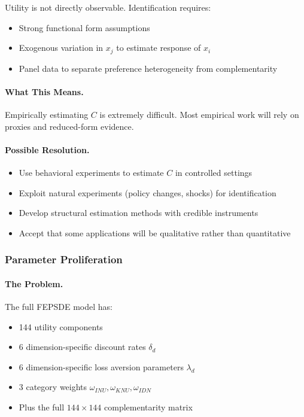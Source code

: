 Utility is not directly observable. Identification requires:
\begin{itemize}
  \item Strong functional form assumptions
  \item Exogenous variation in $x_j$ to estimate response of $x_i$
  \item Panel data to separate preference heterogeneity from complementarity
\end{itemize}

\paragraph{What This Means.}
Empirically estimating $C$ is extremely difficult.
Most empirical work will rely on proxies and reduced-form evidence.

\paragraph{Possible Resolution.}
\begin{itemize}
  \item Use behavioral experiments to estimate $C$ in controlled settings
  \item Exploit natural experiments (policy changes, shocks) for identification
  \item Develop structural estimation methods with credible instruments
  \item Accept that some applications will be qualitative rather than quantitative
\end{itemize}

\subsubsection{Parameter Proliferation}

\paragraph{The Problem.}
The full FEPSDE model has:
\begin{itemize}
  \item 144 utility components
  \item 6 dimension-specific discount rates $\delta_d$
  \item 6 dimension-specific loss aversion parameters $\lambda_d$
  \item 3 category weights $\omega_{INU}, \omega_{KNU}, \omega_{IDN}$
  \item Plus the full $144 \times 144$ complementarity matrix
\end{itemize}

